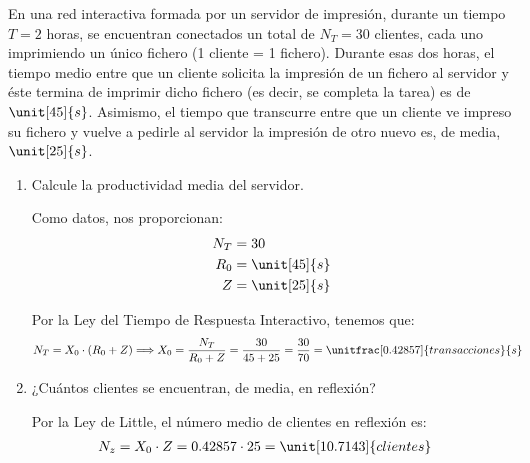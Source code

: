 \begin{ejercicio}\label{ej:5.31}
    En una red interactiva formada por un servidor de impresión, durante un tiempo $T = 2$ horas, se encuentran conectados un total de $N_T = 30$ clientes, cada uno imprimiendo un único fichero (1 cliente = 1 fichero). Durante esas dos horas, el tiempo medio entre que un cliente solicita la impresión de un fichero al servidor y éste termina de imprimir dicho fichero (es decir, se completa la tarea) es de $\unit[45]{s}$. Asimismo, el tiempo que transcurre entre que un cliente ve impreso su fichero y vuelve a pedirle al servidor la impresión de otro nuevo es, de media, $\unit[25]{s}$.
    \begin{enumerate}
        \item Calcule la productividad media del servidor.
        
        Como datos, nos proporcionan:
        \begin{align*}
            N_T &= 30 \\
            R_0 &= \unit[45]{s} \\
            Z &= \unit[25]{s}
        \end{align*}

        Por la Ley del Tiempo de Respuesta Interactivo, tenemos que:
        \begin{align*}
            N_T = X_0 \cdot (R_0 + Z)
            \Longrightarrow X_0 &= \dfrac{N_T}{R_0 + Z} = \dfrac{30}{45 + 25} = \dfrac{30}{70} = \unitfrac[0.42857]{transacciones}{s}
        \end{align*}
        \item ¿Cuántos clientes se encuentran, de media, en reflexión?
        
        Por la Ley de Little, el número medio de clientes en reflexión es:
        \begin{align*}
            N_z &= X_0 \cdot Z = 0.42857 \cdot 25 = \unit[10.7143]{clientes}
        \end{align*}
    \end{enumerate}
\end{ejercicio}
\begin{comment}
\solucion
    \begin{enumerate}
        \item La productividad media del servidor es $X_0 = 0.43$ transacciones/s (nos dan $N_T$, $R_0$ y $Z$). El tiempo $T$ no es necesario para calcular la solución.
        \item El número medio de clientes en reflexión es $N_z = 10.7$ clientes.
    \end{enumerate}
\end{comment}

